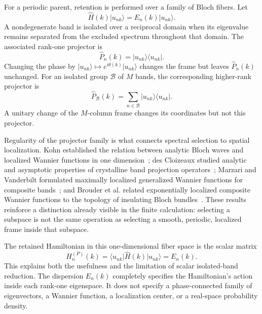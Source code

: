 For a periodic parent, retention is performed over a family of Bloch fibers.
Let
\begin{equation}
  \widehat H(k)\lvert u_{n k}\rangle
  =E_n(k)\lvert u_{n k}\rangle.
\end{equation}
A nondegenerate band is isolated over a reciprocal domain when its eigenvalue
remains separated from the excluded spectrum throughout that domain. The
associated rank-one projector is
\begin{equation}
  \widehat P_n(k)
  =\lvert u_{n k}\rangle\langle u_{n k}\rvert.
  \label{eq:training-isolated-band-projector}
\end{equation}
Changing the phase by
$\lvert u_{n k}\rangle\mapsto e^{i\theta(k)}\lvert u_{n k}\rangle$ changes the
frame but leaves $\widehat P_n(k)$ unchanged. For an isolated group
\(\mathcal B\) of \(M\) bands, the corresponding higher-rank projector is
\begin{equation}
  \widehat P_{\mathcal B}(k)
  =\sum_{n\in\mathcal B}
    \lvert u_{n k}\rangle\langle u_{n k}\rvert.
\end{equation}
A unitary change of the \(M\)-column frame changes its coordinates but not this
projector.

Regularity of the projector family is what connects spectral selection to
spatial localization. Kohn established the relation between analytic Bloch
waves and localized Wannier functions in one dimension~\cite{kohn1959}; des
Cloizeaux studied analytic and asymptotic properties of crystalline band
projection operators~\cite{desCloizeaux1964}; Marzari and Vanderbilt formulated
maximally localized generalized Wannier functions for composite bands~\cite{marzari1997};
and Brouder et al. related exponentially localized composite Wannier functions
to the topology of insulating Bloch bundles~\cite{brouder2007}. These results
reinforce a distinction already visible in the finite calculation: selecting a
subspace is not the same operation as selecting a smooth, periodic, localized
frame inside that subspace.

The retained Hamiltonian in this one-dimensional fiber space is the scalar
matrix
\begin{equation}
  H_n^{(P)}(k)
  =\langle u_{n k}\rvert\widehat H(k)\lvert u_{n k}\rangle
  =E_n(k).
  \label{eq:training-isolated-band-scalar-operator}
\end{equation}
This explains both the usefulness and the limitation of scalar isolated-band
reduction. The dispersion $E_n(k)$ completely specifies the Hamiltonian's
action inside each rank-one eigenspace. It does not specify a phase-connected
family of eigenvectors, a Wannier function, a localization center, or a
real-space probability density.

